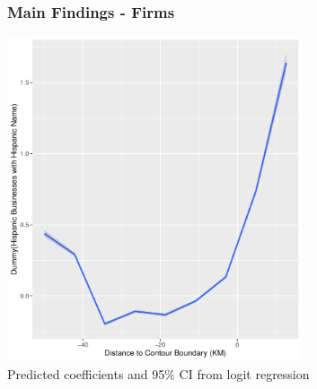 \documentclass{beamer}
\begin{document}
\begin{frame}
\frametitle{Main Findings - Firms}

\centering
        \includegraphics[width=0.65\textwidth]{../../analysis/Output/graphs/hispanicbusnname.pdf}\\
        
\footnotesize Predicted coefficients and 95\% CI from logit regression
\end{frame}
\end{document}

